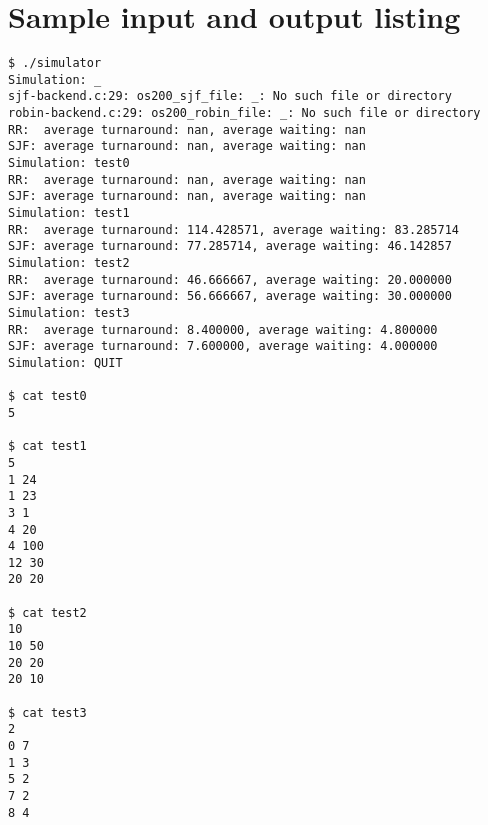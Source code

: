 \documentclass[a4paper,12pt,titlepage]{article}
\begin{document}
\newpage

\section{Sample input and output listing}

\begin{lstlisting}
$ ./simulator
Simulation: _
sjf-backend.c:29: os200_sjf_file: _: No such file or directory
robin-backend.c:29: os200_robin_file: _: No such file or directory
RR:  average turnaround: nan, average waiting: nan
SJF: average turnaround: nan, average waiting: nan
Simulation: test0
RR:  average turnaround: nan, average waiting: nan
SJF: average turnaround: nan, average waiting: nan
Simulation: test1
RR:  average turnaround: 114.428571, average waiting: 83.285714
SJF: average turnaround: 77.285714, average waiting: 46.142857
Simulation: test2
RR:  average turnaround: 46.666667, average waiting: 20.000000
SJF: average turnaround: 56.666667, average waiting: 30.000000
Simulation: test3
RR:  average turnaround: 8.400000, average waiting: 4.800000
SJF: average turnaround: 7.600000, average waiting: 4.000000
Simulation: QUIT

$ cat test0
5

$ cat test1
5
1 24
1 23
3 1
4 20
4 100
12 30
20 20

$ cat test2
10
10 50
20 20
20 10

$ cat test3
2
0 7
1 3
5 2
7 2
8 4
\end{lstlisting}
\end{document}
